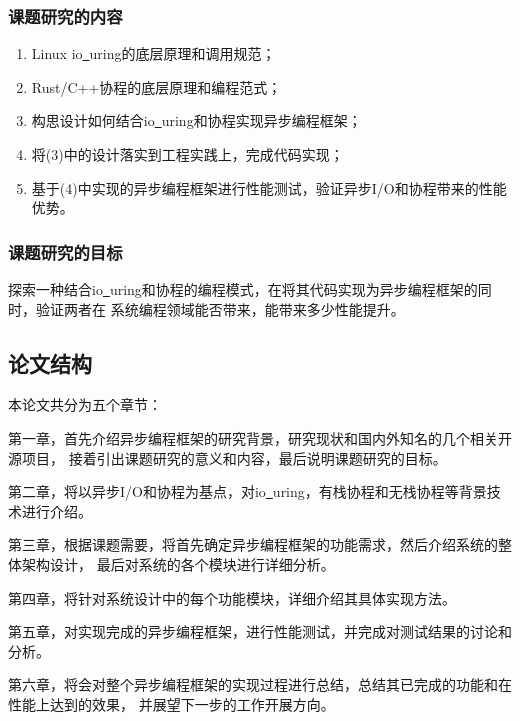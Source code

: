 \documentclass[supercite]{HustGraduPaper}
\theoremstyle{definition}
\begin{document}
\subsubsection{课题研究的内容}
\begin{enumerate}
  \item Linux io\underline{~}uring的底层原理和调用规范；
  \item Rust/C++协程的底层原理和编程范式；
  \item 构思设计如何结合io\underline{~}uring和协程实现异步编程框架；
  \item 将(3)中的设计落实到工程实践上，完成代码实现；
  \item 基于(4)中实现的异步编程框架进行性能测试，验证异步I/O和协程带来的性能优势。
\end{enumerate}

\subsubsection{课题研究的目标}
探索一种结合io\underline{~}uring和协程的编程模式，在将其代码实现为异步编程框架的同时，验证两者在
系统编程领域能否带来，能带来多少性能提升。\par

\subsection{论文结构}
本论文共分为五个章节：\par

第一章，首先介绍异步编程框架的研究背景，研究现状和国内外知名的几个相关开源项目，
接着引出课题研究的意义和内容，最后说明课题研究的目标。\par

第二章，将以异步I/O和协程为基点，对io\underline{~}uring，有栈协程和无栈协程等背景技术进行介绍。\par

第三章，根据课题需要，将首先确定异步编程框架的功能需求，然后介绍系统的整体架构设计，
最后对系统的各个模块进行详细分析。\par

第四章，将针对系统设计中的每个功能模块，详细介绍其具体实现方法。\par

第五章，对实现完成的异步编程框架，进行性能测试，并完成对测试结果的讨论和分析。\par

第六章，将会对整个异步编程框架的实现过程进行总结，总结其已完成的功能和在性能上达到的效果，
并展望下一步的工作开展方向。\par
\end{document}
